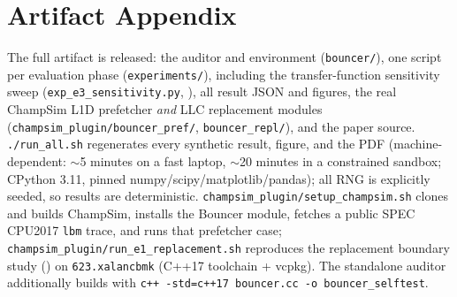 \documentclass{article}
\begin{document}
\section*{Artifact Appendix}
The full artifact is released: the auditor and environment
(\texttt{bouncer/}), one script per evaluation phase (\texttt{experiments/}),
including the transfer-function sensitivity sweep
(\texttt{exp\_e3\_sensitivity.py}, ), all result JSON and figures,
the real ChampSim L1D prefetcher \emph{and} LLC replacement modules
(\texttt{champsim\_plugin/bouncer\_pref/}, \texttt{bouncer\_repl/}), and the paper
source. \texttt{./run\_all.sh} regenerates every synthetic result, figure, and the
PDF (machine-dependent: $\sim$5 minutes on a fast laptop, $\sim$20 minutes in a constrained
sandbox; CPython 3.11, pinned numpy/scipy/matplotlib/pandas); all RNG is
explicitly seeded, so results are deterministic.
\texttt{champsim\_plugin/setup\_champsim.sh} clones and builds ChampSim, installs
the Bouncer module, fetches a public SPEC\,CPU2017 \texttt{lbm} trace, and runs
that prefetcher case; \texttt{champsim\_plugin/run\_e1\_replacement.sh}
reproduces the  replacement boundary study
() on \texttt{623.xalancbmk} (C++17 toolchain + vcpkg). The standalone auditor additionally builds with
\texttt{c++ -std=c++17 bouncer.cc -o bouncer\_selftest}.



\end{document}
